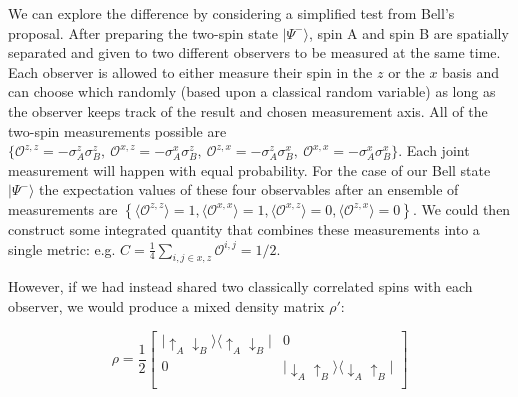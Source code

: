We can explore the difference by considering a simplified test from Bell's proposal.  After preparing the two-spin state $|\Psi^-\rangle$, spin A and spin B are spatially separated and given to two different observers to be measured at the same time. Each observer is allowed to either measure their spin in the $z$ or the $x$ basis and can choose which randomly (based upon a classical random variable) as long as the observer keeps track of the result and chosen measurement axis. All of the two-spin measurements  possible are $\{ \mathcal{O}^{z,z}=- \sigma^z_A \sigma^z_B , ~\mathcal{O}^{x,z} = - \sigma^x_A \sigma^z_B, ~\mathcal{O}^{z,x}=- \sigma^z_A \sigma^x_B, ~\mathcal{O}^{x,x}=- \sigma^x_A \sigma^x_B \}$. Each joint measurement will happen with equal probability.  For the case of our Bell state $| \Psi^- \rangle$ the expectation values of these four observables after an ensemble of measurements are $\left \{ \langle \mathcal{O}^{z,z} \rangle = 1,\langle \mathcal{O}^{x,x} \rangle = 1,\langle \mathcal{O}^{x,z} \rangle = 0,\langle \mathcal{O}^{z,x} \rangle = 0 \right \}$. We could then construct some integrated quantity that combines these measurements into a single metric: e.g. $C=\frac{1}{4} \sum_{i,j\in x,z} \mathcal{O}^{i,j}= 1/2$. 

However, if we had instead shared two classically correlated spins with each observer, we would produce a mixed density matrix $\rho'$: 

\[\rho = \frac{1}{2} \begin{bmatrix}
| \uparrow_A \downarrow_B \rangle \langle \uparrow_A \downarrow_B | & 0  \\
0 & | \downarrow_A \uparrow_B \rangle \langle \downarrow_A \uparrow_B | \\
\end{bmatrix}\]

